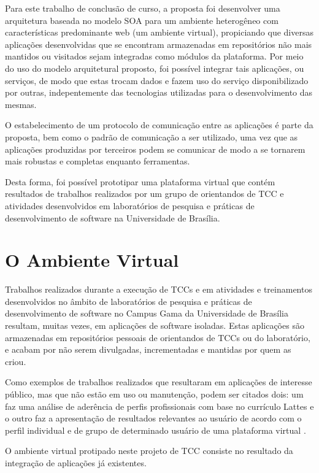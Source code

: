 Para este trabalho de conclusão de curso, a proposta foi desenvolver uma arquitetura baseada no modelo SOA para um ambiente heterogêneo com características predominante web (um ambiente virtual), propiciando que diversas aplicações desenvolvidas que se encontram armazenadas em repositórios não mais mantidos ou visitados sejam integradas como módulos da plataforma. Por meio do uso do modelo arquitetural proposto, foi possível integrar tais aplicações, ou serviços, de modo que estas trocam dados e fazem uso do serviço disponibilizado por outras, indepentemente das tecnologias utilizadas para o desenvolvimento das mesmas.

O estabelecimento de um protocolo de comunicação entre as aplicações é parte da proposta, bem como o padrão de comunicação a ser utilizado, uma vez que as aplicações produzidas por terceiros podem se comunicar de modo a se tornarem mais robustas e completas enquanto ferramentas.

Desta forma, foi possível prototipar uma plataforma virtual que contém resultados de trabalhos realizados por um grupo de orientandos de TCC e atividades desenvolvidos em laboratórios de pesquisa e práticas de desenvolvimento de software na Universidade de Brasília.

\section{O Ambiente Virtual}

Trabalhos realizados durante a execução de TCCs e em atividades e treinamentos desenvolvidos no âmbito de laboratórios de pesquisa e práticas de desenvolvimento de software no Campus Gama da Universidade de Brasília resultam, muitas vezes, em aplicações de software isoladas. Estas aplicações são armazenadas em repositórios pessoais de orientandos de TCCs ou do laboratório, e acabam por não serem divulgadas, incrementadas e mantidas por quem as criou.

Como exemplos de trabalhos realizados que resultaram em aplicações de interesse público, mas que não estão em uso ou manutenção, podem ser citados dois: um faz uma análise de aderência de perfis profissionais com base no currículo Lattes \cite{jesus_algoritmo_2014} e o outro faz a apresentação de resultados relevantes ao usuário de acordo com o perfil individual e de grupo de determinado usuário de uma plataforma virtual \cite{carvalho_sistema_2014}.

O ambiente virtual protipado neste projeto de TCC consiste no resultado da integração de aplicações já existentes.

